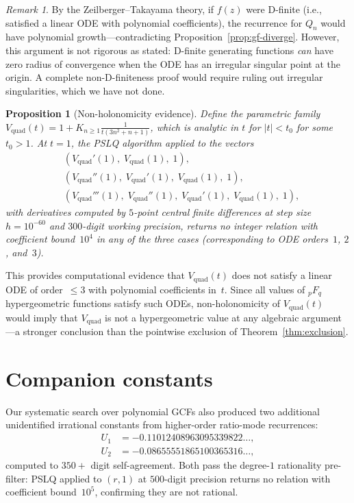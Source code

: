 \documentclass[11pt,a4paper]{article}
\newtheorem{proposition}[theorem]{Proposition}
\theoremstyle{definition}
\theoremstyle{remark}
\newtheorem{remark}[theorem]{Remark}
\newcommand{\Vq}{V_{\mathrm{quad}}}
\begin{document}
\begin{remark}
By the Zeilberger--Takayama theory, if $f(z)$ were D-finite
(i.e., satisfied a linear ODE with polynomial coefficients), the
recurrence for $Q_n$ would have polynomial growth---contradicting
Proposition~\ref{prop:gf-diverge}.  However, this argument is not
rigorous as stated: D-finite generating functions \emph{can} have
zero radius of convergence when the ODE has an irregular singular
point at the origin.  A complete non-D-finiteness proof would
require ruling out irregular singularities, which we have not done.
\end{remark}

\begin{proposition}[Non-holonomicity evidence]\label{prop:non-dfinite}
Define the parametric family
$\Vq(t) = 1 + K_{n \ge 1} \frac{1}{t(3n^2+n+1)}$,
which is analytic in $t$ for $|t| < t_0$ for some $t_0 > 1$.
At $t = 1$, the PSLQ algorithm applied to the vectors
\begin{align*}
  &(\Vq'(1),\; \Vq(1),\; 1), \\
  &(\Vq''(1),\; \Vq'(1),\; \Vq(1),\; 1), \\
  &(\Vq'''(1),\; \Vq''(1),\; \Vq'(1),\; \Vq(1),\; 1),
\end{align*}
with derivatives computed by $5$-point central finite differences
at step size $h = 10^{-60}$ and $300$-digit working precision,
returns no integer relation with coefficient bound~$10^4$ in any
of the three cases (corresponding to ODE orders~$1$, $2$, and~$3$).
\end{proposition}

This provides computational evidence that $\Vq(t)$ does not satisfy
a linear ODE of order~$\leq 3$ with polynomial coefficients in~$t$.
Since all values of ${}_pF_q$ hypergeometric functions satisfy such
ODEs, non-holonomicity of $\Vq(t)$ would imply that $\Vq$ is not
a hypergeometric value at any algebraic argument---a stronger
conclusion than the pointwise exclusion of
Theorem~\ref{thm:exclusion}.


\section{Companion constants}\label{sec:companions}

Our systematic search over polynomial GCFs also produced two additional
unidentified irrational constants from higher-order ratio-mode recurrences:
\begin{align*}
  U_1 &= -0.11012408963095339822\ldots, \\
  U_2 &= -0.08655551865100365316\ldots,
\end{align*}
computed to $350+$ digit self-agreement.  Both pass the degree-$1$
rationality pre-filter: PSLQ applied to $(r, 1)$ at $500$-digit
precision returns no relation with coefficient bound~$10^5$,
confirming they are not rational.
\end{document}
